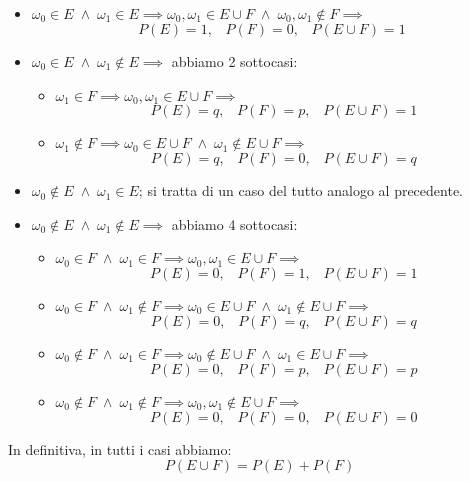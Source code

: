 \documentclass{article}
\begin{document}
\begin{itemize}
\item $\omega_{0} \in E \; \wedge \; \omega_{1} \in E \implies \omega_{0},\omega_{1} \in E \cup F \; \wedge \; \omega_{0},\omega_{1} \notin F \implies$
\[ P(E) = 1, \; \; \; P(F) = 0, \; \; \; P(E \cup F) = 1 \]
\item $\omega_{0} \in E \; \wedge \; \omega_{1} \notin E \implies$ abbiamo 2 sottocasi:
\begin{itemize}
\item $\omega_{1} \in F \implies \omega_{0},\omega_{1} \in E \cup F \implies$
\[ P(E) = q, \; \; \; P(F) = p, \; \; \; P(E \cup F) = 1 \]
\item $\omega_{1} \notin F \implies \omega_{0} \in E \cup F \; \wedge \; \omega_{1} \notin E \cup F \implies$
\[ P(E) = q, \; \; \; P(F) = 0, \; \; \; P(E \cup F) = q \]
\end{itemize}
\item $\omega_{0} \notin E \; \wedge \; \omega_{1} \in E$; si tratta di un caso del tutto analogo al precedente.
\item $\omega_{0} \notin E \; \wedge \; \omega_{1} \notin E \implies$ abbiamo 4 sottocasi:
\begin{itemize}
\item $\omega_{0} \in F \; \wedge \; \omega_{1} \in F \implies \omega_{0},\omega_{1} \in E \cup F \implies$
\[ P(E) = 0, \; \; \; P(F) = 1, \; \; \; P(E \cup F) = 1 \]
\item $\omega_{0} \in F \; \wedge \; \omega_{1} \notin F \implies \omega_{0} \in E \cup F \; \wedge \; \omega_{1} \notin E \cup F \implies$
\[ P(E) = 0, \; \; \; P(F) = q, \; \; \; P(E \cup F) = q \]
\item $\omega_{0} \notin F \; \wedge \; \omega_{1} \in F \implies \omega_{0} \notin E \cup F \; \wedge \; \omega_{1} \in E \cup F \implies$
\[ P(E) = 0, \; \; \; P(F) = p, \; \; \; P(E \cup F) = p \]
\item $\omega_{0} \notin F \; \wedge \; \omega_{1} \notin F \implies \omega_{0},\omega_{1} \notin E \cup F \implies$
\[ P(E) = 0, \; \; \; P(F) = 0, \; \; \; P(E \cup F) = 0 \]
\end{itemize}
\end{itemize}
In definitiva, in tutti i casi abbiamo:
\[ P(E \cup F) = P(E)+P(F) \]
\end{document}

